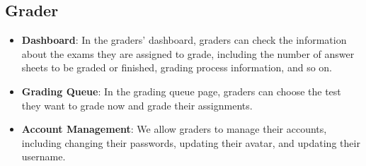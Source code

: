 \documentclass[12pt]{article}
\begin{document}
\subsection{Grader}
\begin{itemize}
    \item \textbf{Dashboard}: In the graders' dashboard, graders can check the information about the exams they are assigned to grade, including the number of answer sheets to be graded or finished, grading process information, and so on.
    
    \item \textbf{Grading Queue}: In the grading queue page, graders can choose the test they want to grade now and grade their assignments.
    
    \item \textbf{Account Management}: We allow graders to manage their accounts, including changing their passwords, updating their avatar, and updating their username.
\end{itemize}
\end{document}
